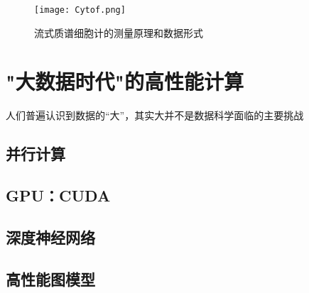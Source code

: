 \begin{figure}[htbp]
	\centering
	\texttt{[image: Cytof.png]}
	\caption{流式质谱细胞计的测量原理和数据形式}\label{fig:Cytof}
\end{figure}

\chapter{"大数据时代"的高性能计算}
人们普遍认识到数据的“大”，其实大并不是数据科学面临的主要挑战
\section{并行计算}

\section{GPU：CUDA}

\section{深度神经网络}

\section{高性能图模型}


